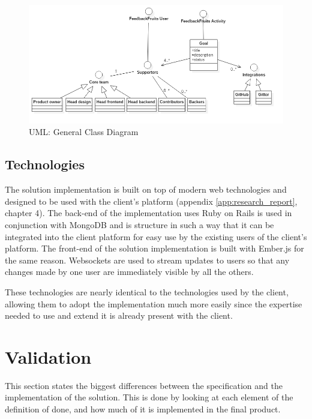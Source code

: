 \begin{figure}[hb!]
    \centering
    \includegraphics*[width=\textwidth, keepaspectratio=true]{./media/uml}
    \caption{UML: General Class Diagram}
    \label{fig:classdiagram}
\end{figure}
\newpage

\subsection{Technologies}
The solution implementation is built on top of modern web technologies and designed to be used with the client's platform (appendix \ref{app:research_report}, chapter 4). The back-end of the implementation uses Ruby on Rails is used in conjunction with MongoDB and is structure in such a way that it can be integrated into the client platform for easy use by the existing users of the client's platform. The front-end of the solution implementation is built with Ember.js for the same reason. Websockets are used to stream updates to users so that any changes made by one user are immediately visible by all the others.

These technologies are nearly identical to the technologies used by the client, allowing them to adopt the implementation much more easily since the expertise needed to use and extend it is already present with the client.




\section{Validation}
This section states the biggest differences between the specification and the implementation of the solution. This is done by looking at each element of the definition of done, and how much of it is implemented in the final product.

